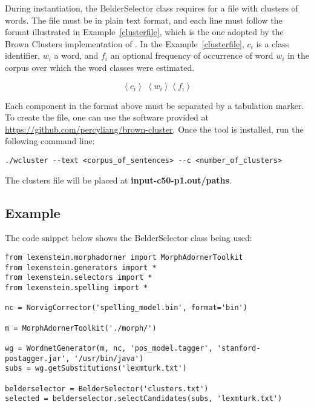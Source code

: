 During instantiation, the BelderSelector class requires for a file with clusters of words. The file must be in plain text format, and each line must follow the format illustrated in Example~\ref{clusterfile}, which is the one adopted by the Brown Clusters implementation of \cite{brownclusters}. In the Example~\ref{clusterfile}, $c_{i}$ is a class identifier, $w_{i}$ a word, and $f_{i}$ an optional frequency of occurrence of word $w_{i}$ in the corpus over which the word classes were estimated.

\begin{equation}
\label{clusterfile}
\left\langle c_{i} \right\rangle\; \left\langle w_{i} \right\rangle \left\langle f_{i} \right\rangle
\end{equation}

Each component in the format above must be separated by a tabulation marker. To create the file, one can use the software provided at \url{https://github.com/percyliang/brown-cluster}. Once the tool is installed, run the following command line:

\begin{lstlisting}
./wcluster --text <corpus_of_sentences> --c <number_of_clusters>
\end{lstlisting}

The clusters file will be placed at \textbf{input-c50-p1.out/paths}.

\subsection{Example}

The code snippet below shows the BelderSelector class being used:

\begin{lstlisting}
from lexenstein.morphadorner import MorphAdornerToolkit
from lexenstein.generators import *
from lexenstein.selectors import *
from lexenstein.spelling import *

nc = NorvigCorrector('spelling_model.bin', format='bin')

m = MorphAdornerToolkit('./morph/')

wg = WordnetGenerator(m, nc, 'pos_model.tagger', 'stanford-postagger.jar', '/usr/bin/java')
subs = wg.getSubstitutions('lexmturk.txt')

belderselector = BelderSelector('clusters.txt')
selected = belderselector.selectCandidates(subs, 'lexmturk.txt')
\end{lstlisting}









